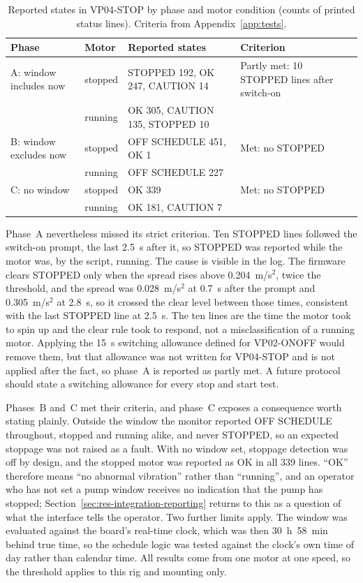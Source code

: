 \begin{table}[H]
\centering\begingroup\methodtabset
\caption{Reported states in VP04-STOP by phase and motor condition (counts of printed status lines).
Criteria from Appendix~\ref{app:tests}.}
\label{tab:res-vp04}
\begin{tabularx}{\linewidth}{|Q{2.4cm}|Q{1.6cm}|Z|Q{2.9cm}|}
\hline
\textbf{Phase} & \textbf{Motor} & \textbf{Reported states} & \textbf{Criterion} \\
\hline
A: window includes now & stopped & STOPPED 192, OK 247, CAUTION 14 & Partly met: 10 STOPPED lines after switch-on \\
 & running & OK 305, CAUTION 135, STOPPED 10 & \\ \hline
B: window excludes now & stopped & OFF SCHEDULE 451, OK 1 & Met: no STOPPED \\
 & running & OFF SCHEDULE 227 & \\ \hline
C: no window & stopped & OK 339 & Met: no STOPPED \\
 & running & OK 181, CAUTION 7 & \\ \hline
\end{tabularx}
\endgroup
\end{table}

Phase~A nevertheless missed its strict criterion. Ten STOPPED lines followed the switch-on prompt, the
last 2.5~s after it, so STOPPED was reported while the motor was, by the script, running. The cause is
visible in the log. The firmware clears STOPPED only when the spread rises above 0.204~m/s$^2$, twice
the threshold, and the spread was 0.028~m/s$^2$ at 0.7~s after the prompt and 0.305~m/s$^2$ at
2.8~s, so it crossed the clear level between those times, consistent with the last STOPPED line at
2.5~s. The ten lines are the time the motor took to spin up and the clear rule took to respond, not a
misclassification of a running motor. Applying the 15~s switching allowance defined for VP02-ONOFF
would remove them, but that allowance was not written for VP04-STOP and is not applied after the
fact, so phase~A is reported as partly met. A future protocol should state a switching allowance for
every stop and start test.

Phases~B and~C met their criteria, and phase~C exposes a consequence worth stating plainly. Outside
the window the monitor reported OFF SCHEDULE throughout, stopped and running alike, and never STOPPED,
so an expected stoppage was not raised as a fault. With no window set, stoppage detection was off by
design, and the stopped motor was reported as OK in all 339 lines. ``OK'' therefore means ``no
abnormal vibration'' rather than ``running'', and an operator who has not set a pump window receives
no indication that the pump has stopped; Section~\ref{sec:res-integration-reporting} returns to this as
a question of what the interface tells the operator. Two further limits apply. The window was evaluated
against the board's real-time clock, which was then 30~h~58~min behind true time, so the schedule
logic was tested against the clock's own time of day rather than calendar time. All results come from
one motor at one speed, so the threshold applies to this rig and mounting only.

